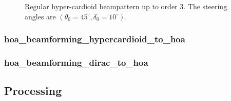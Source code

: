 \documentclass[10pt,a4paper]{article}
\begin{document}
\begin{figure}[!ht]
\caption{Regular hyper-cardioid beampattern up to order 3. The steering angles are $(\theta_0 = 45^\circ, \delta_0=10^\circ)$.}
\label{fig:hoa_beamforming_hypercardioids}
\end{figure}

\subsubsection{hoa\_beamforming\_hypercardioid\_to\_hoa}
\subsubsection{hoa\_beamforming\_dirac\_to\_hoa}

\pagebreak
\subsection{Processing}
\end{document}
